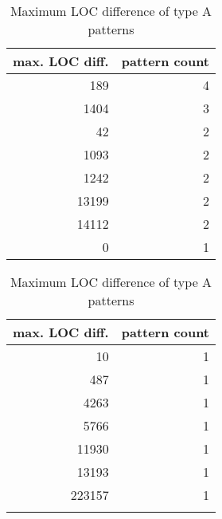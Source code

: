 \newcommand{\tableHeadTypeALocDiff}{\bfseries{max. LOC diff.}\rm &
\bfseries{pattern count}\rm}
\begin{table}[H]
\caption{Maximum LOC difference of type A patterns}\label{table:type_a_max_diff}
\centering
\begin{tabular}{rr}
\hline
	\tableHeadTypeALocDiff \\
	\hline
   189 &   4 \\ 
  1404 &   3 \\ 
   42 &   2 \\ 
  1093 &   2 \\ 
  1242 &   2 \\ 
  13199 &   2 \\ 
  14112 &   2 \\ 
    0 &   1 \\
\hline
\end{tabular}
\begin{tabular}{rr}
\hline
  \tableHeadTypeALocDiff \\
  \hline 
   10 &   1 \\ 
  487 &   1 \\ 
  4263 &   1 \\ 
  5766 &   1 \\ 
  11930 &   1 \\ 
  13193 &   1 \\ 
  223157 &   1 \\
  \\ 
\hline
\end{tabular}
\end{table}